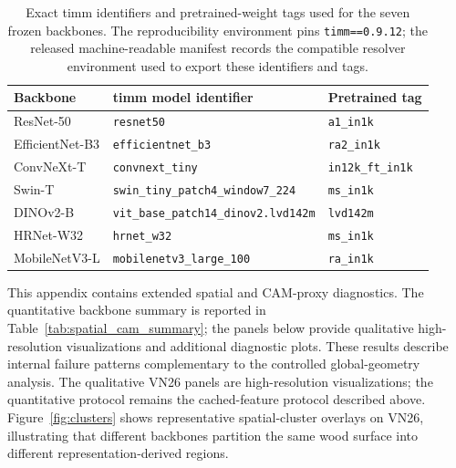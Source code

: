 \documentclass[a4paper,fleqn]{els-cas-templates/cas-sc}
\begin{document}
\begin{table}[pos=htbp]
\centering
\caption{Exact timm identifiers and pretrained-weight tags used for the seven
frozen backbones. The reproducibility environment pins \texttt{timm==0.9.12};
the released machine-readable manifest records the compatible resolver
environment used to export these identifiers and tags.}
\label{tab:backbone_manifest}
\scriptsize
\begin{tabular}{lll}
\toprule
Backbone & timm model identifier & Pretrained tag \\
\midrule
ResNet-50 & \texttt{resnet50} & \texttt{a1\_in1k} \\
EfficientNet-B3 & \texttt{efficientnet\_b3} & \texttt{ra2\_in1k} \\
ConvNeXt-T & \texttt{convnext\_tiny} & \texttt{in12k\_ft\_in1k} \\
Swin-T & \texttt{swin\_tiny\_patch4\_window7\_224} & \texttt{ms\_in1k} \\
DINOv2-B & \texttt{vit\_base\_patch14\_dinov2.lvd142m} & \texttt{lvd142m} \\
HRNet-W32 & \texttt{hrnet\_w32} & \texttt{ms\_in1k} \\
MobileNetV3-L & \texttt{mobilenetv3\_large\_100} & \texttt{ra\_in1k} \\
\bottomrule
\end{tabular}
\end{table}

This appendix contains extended spatial and CAM-proxy diagnostics. The
quantitative backbone summary is reported in
Table~\ref{tab:spatial_cam_summary}; the panels below provide qualitative
high-resolution visualizations and additional diagnostic plots. These results
describe internal failure patterns complementary to the controlled
global-geometry analysis. The qualitative VN26 panels are high-resolution
visualizations; the quantitative protocol remains the cached-feature protocol
described above. Figure~\ref{fig:clusters} shows representative spatial-cluster
overlays on VN26, illustrating that different backbones partition the same wood
surface into different representation-derived regions.
\end{document}
